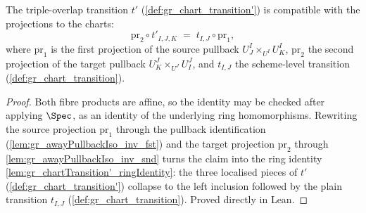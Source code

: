 \begin{lemma}

  \label{lem:gr_chartTransition'_fac}
  The triple-overlap transition \(t'\) (\cref{def:gr_chart_transition'}) is
  compatible with the projections to the charts:
  \[
    \mathrm{pr}_2 \circ t'_{I,J,K} \;=\; t_{I,J} \circ \mathrm{pr}_1 ,
  \]
  where \(\mathrm{pr}_1\) is the first projection of the source pullback
  \(U^I_J \times_{U^I} U^I_K\), \(\mathrm{pr}_2\) the second projection of the
  target pullback \(U^J_K \times_{U^J} U^J_I\), and \(t_{I,J}\) the scheme-level
  transition (\cref{def:gr_chart_transition}).
\end{lemma}
\begin{proof}
  \leanok
  Both fibre products are affine, so the identity may be checked after applying
  \(\Spec\), as an identity of the underlying ring homomorphisms. Rewriting the
  source projection \(\mathrm{pr}_1\) through the pullback identification
  (\cref{lem:gr_awayPullbackIso_inv_fst}) and the target projection
  \(\mathrm{pr}_2\) through \cref{lem:gr_awayPullbackIso_inv_snd} turns the claim
  into the ring identity \cref{lem:gr_chartTransition'_ringIdentity}: the three
  localised pieces of \(t'\) (\cref{def:gr_chart_transition'}) collapse to the
  left inclusion followed by the plain transition \(t_{I,J}\)
  (\cref{def:gr_chart_transition}). Proved directly in Lean.
\end{proof}


